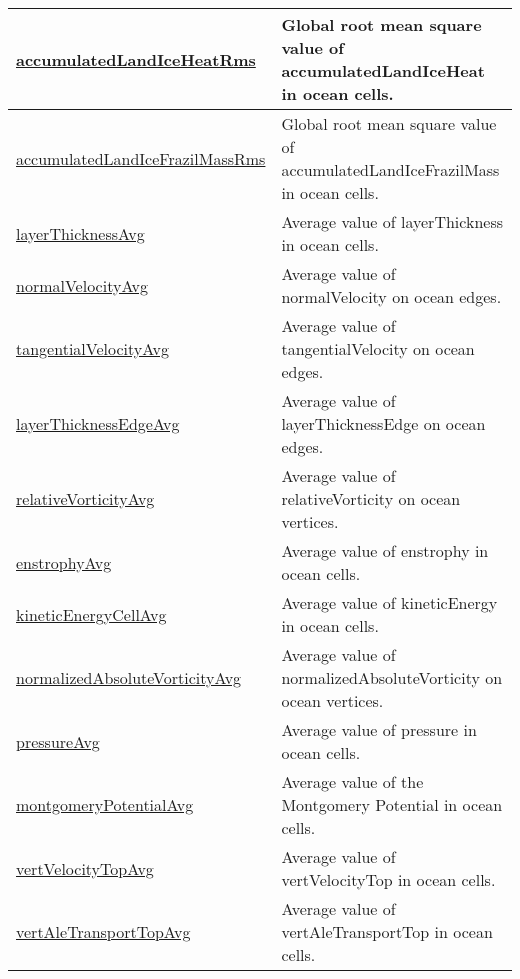 {\begin{center}
\begin{longtable}{| p{2.0in} | p{4.0in} |}
    \hline
    \hyperref[subsec:var_sec_globalStatsAM_accumulatedLandIceHeatRms]{accumulatedLandIceHeatRms} & Global root mean square value of accumulatedLandIceHeat in ocean cells. \\
    \hline
    \hyperref[subsec:var_sec_globalStatsAM_accumulatedLandIceFrazilMassRms]{accumulatedLandIceFrazilMass\-Rms} & Global root mean square value of accumulatedLandIceFrazilMass in ocean cells. \\
    \hline
    \hyperref[subsec:var_sec_globalStatsAM_layerThicknessAvg]{layerThicknessAvg} & Average value of layerThickness in ocean cells. \\
    \hline
    \hyperref[subsec:var_sec_globalStatsAM_normalVelocityAvg]{normalVelocityAvg} & Average value of normalVelocity on ocean edges. \\
    \hline
    \hyperref[subsec:var_sec_globalStatsAM_tangentialVelocityAvg]{tangentialVelocityAvg} & Average value of tangentialVelocity on ocean edges. \\
    \hline
    \hyperref[subsec:var_sec_globalStatsAM_layerThicknessEdgeAvg]{layerThicknessEdgeAvg} & Average value of layerThicknessEdge on ocean edges. \\
    \hline
    \hyperref[subsec:var_sec_globalStatsAM_relativeVorticityAvg]{relativeVorticityAvg} & Average value of relativeVorticity on ocean vertices. \\
    \hline
    \hyperref[subsec:var_sec_globalStatsAM_enstrophyAvg]{enstrophyAvg} & Average value of enstrophy in ocean cells. \\
    \hline
    \hyperref[subsec:var_sec_globalStatsAM_kineticEnergyCellAvg]{kineticEnergyCellAvg} & Average value of kineticEnergy in ocean cells. \\
    \hline
    \hyperref[subsec:var_sec_globalStatsAM_normalizedAbsoluteVorticityAvg]{normalizedAbsoluteVorticityAvg} & Average value of normalizedAbsoluteVorticity on ocean vertices. \\
    \hline
    \hyperref[subsec:var_sec_globalStatsAM_pressureAvg]{pressureAvg} & Average value of pressure in ocean cells. \\
    \hline
    \hyperref[subsec:var_sec_globalStatsAM_montgomeryPotentialAvg]{montgomeryPotentialAvg} & Average value of the Montgomery Potential in ocean cells. \\
    \hline
    \hyperref[subsec:var_sec_globalStatsAM_vertVelocityTopAvg]{vertVelocityTopAvg} & Average value of vertVelocityTop in ocean cells. \\
    \hline
    \hyperref[subsec:var_sec_globalStatsAM_vertAleTransportTopAvg]{vertAleTransportTopAvg} & Average value of vertAleTransportTop in ocean cells. \\

\end{longtable}
\end{center}}
